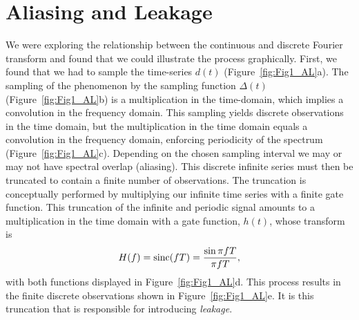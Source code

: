 
\section{Aliasing and Leakage}


We were exploring the relationship between the continuous and discrete Fourier transform 
and  found that we could illustrate the process graphically.  First, we found that we had to sample 
the time-series $d(t)$ (Figure~\ref{fig:Fig1_AL}a).  The sampling of the phenomenon by the sampling function $\Delta(t)$
(Figure~\ref{fig:Fig1_AL}b) is a multiplication in the time-domain, which implies a convolution in the frequency domain.
This sampling yields discrete observations in the time domain, but the multiplication in the time
domain equals a convolution in the frequency domain, enforcing periodicity of the spectrum (Figure~\ref{fig:Fig1_AL}c).
Depending on the chosen sampling interval we may or may not have spectral overlap (aliasing). 
This discrete infinite series must then be truncated to contain a finite number of observations.  
The truncation is conceptually performed by multiplying our infinite time series with a finite gate function.
This truncation of the infinite and periodic signal amounts to a multiplication in the time domain with a gate function, $h(t)$,
whose transform is
\begin{equation}
	H(f) = \operatorname{sinc} (fT) = \frac{\sin \pi fT}{\pi fT},
\end{equation}
with both functions displayed in Figure~\ref{fig:Fig1_AL}d.  This process results in the finite discrete observations
shown in Figure~\ref{fig:Fig1_AL}e.
It is this truncation that is responsible for introducing \emph{leakage}.

